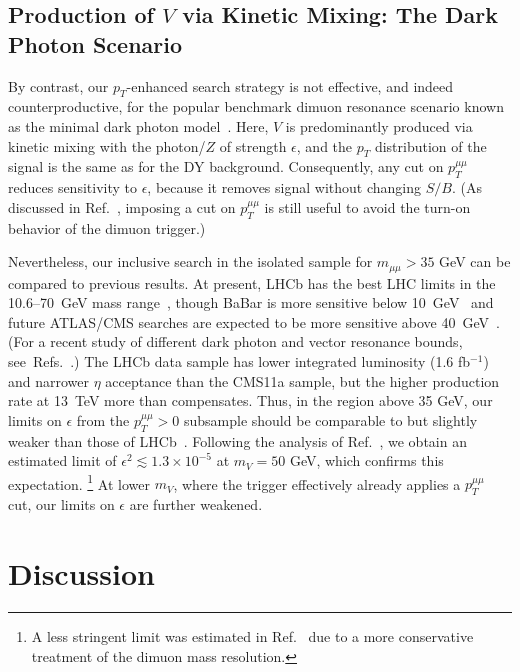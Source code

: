 \documentclass[aps,prd,twocolumn,superscriptaddress,preprintnumbers,nofootinbib,longbibliography,floatfix]{revtex4-1}
\newcommand{\nameofsearch}{$p_T$-enhanced }
\newcommand{\ptmm}{p_T^{\mu\mu}}
\newcommand{\inv}{$^{-1}$}
\DeclareRobustCommand{\Ref}[1]{Ref.~\cite{#1}}
\DeclareRobustCommand{\Refs}[1]{Refs.~\cite{#1}}
\begin{document}
\subsection{Production of $V$ via Kinetic Mixing:  The Dark Photon Scenario}


By contrast, our \nameofsearch search strategy is not effective, and indeed counterproductive, for the popular benchmark dimuon resonance scenario known as the minimal dark photon model~\cite{Okun:1982xi,Galison:1983pa,Holdom:1985ag,Pospelov:2007mp,ArkaniHamed:2008qn,Bjorken:2009mm}.
%
Here, $V$ is predominantly produced via kinetic mixing with the photon/$Z$ of strength $\epsilon$, and the $p_T$ distribution of the signal is the same as for the DY background.
%
Consequently, any cut on $\ptmm$ reduces sensitivity to $\epsilon$, because it removes signal without changing $S/B$.
%
(As discussed in \Ref{Hoenig:2014dsa}, imposing a cut on $\ptmm$ is still useful to avoid the turn-on behavior of the dimuon trigger.)


Nevertheless, our inclusive search in the isolated sample for $m_{\mu\mu}>35$ GeV can be  compared to previous results.
%   
At present, LHCb has the best LHC limits in the 10.6--70~GeV mass range~\cite{Ilten:2016tkc,Aaij:2017rft}, though BaBar is more sensitive below 10~GeV~\cite{Lees:2014xha} and future ATLAS/CMS searches are expected to be more sensitive above 40~GeV~\cite{Curtin:2014cca}.
%
(For a recent study of different dark photon and vector resonance bounds, see~\Refs{Ilten:2018crw,Bauer:2018onh}.)
%
The LHCb data sample has lower integrated luminosity (1.6 fb\inv) and narrower $\eta$ acceptance than the CMS11a sample, but the higher production rate at 13~TeV more than compensates.
%  
Thus, in the region above 35 GeV, our limits on $\epsilon$ from the $\ptmm>0$ subsample should be comparable to but slightly weaker than those of LHCb~\cite{Aaij:2017rft}.
%
Following the analysis of \Ref{Ilten:2016tkc}, we obtain an estimated limit of $\epsilon^2 \lesssim1.3 \times 10^{-5}$ at $m_V=50$ GeV, which confirms this expectation.%
%
\footnote{A less stringent limit was estimated in \Ref{Hoenig:2014dsa} due to a more conservative treatment of the dimuon mass resolution.}
%
At lower $m_V$, where the trigger effectively already applies a $\ptmm$ cut, our limits on $\epsilon$ are further weakened.



\section{Discussion}
\label{sec:discussion}
\end{document}
